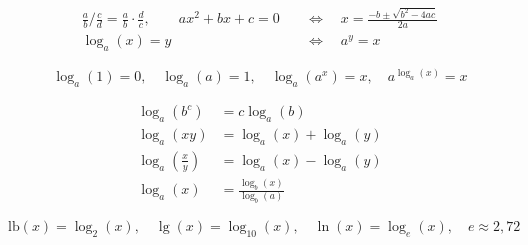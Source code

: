 \documentclass[12pt]{article}
\begin{document}
\begin{equation*}
\begin{split}
\frac{a}{b}\bigg/\frac{c}{d}
=\frac{a}{b}\cdot\frac{d}{c},\qquad
ax^2+bx+c=0\quad&\Leftrightarrow\quad x=\frac{-b\pm\sqrt{b^2-4ac}}{2a}\\[2mm]
\log_a(x)=y\quad&\Leftrightarrow\quad a^y=x
\end{split}
\end{equation*}


$$
\log_a(1)=0,\quad
\log_a(a)=1,\quad
\log_a(a^x)=x,\quad
a^{\log_a(x)}=x
$$

\begin{equation*}
\begin{split}
\log_a(b^c)&=c\log_a(b)\\
\log_a(xy)&=\log_a(x)+\log_a(y)\\
\log_a\left(\frac{x}{y}\right)
&=\log_a(x)-\log_a(y)\\
\log_a(x)&=\frac{\log_b(x)}{\log_b(a)}
\end{split}
\end{equation*}

$$
\textrm{lb}(x)=\log_2(x),\quad
\lg(x)=\log_{10}(x),\quad
\ln(x)=\log_e(x),\quad
e\approx 2,72
$$
\end{document}
